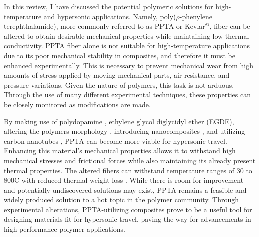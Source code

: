 \documentclass[12pt]{article}
\begin{document}
\begin{multicols}{2}
\indent In this review, I have discussed the potential polymeric solutions for high-temperature and hypersonic applications. Namely, poly($\rho$-phenylene terephthalamide), more commonly referred to as PPTA or Kevlar$^{\text{\textcopyright}}$, fiber can be altered to obtain desirable mechanical properties while maintaining low thermal conductivity. \citep{LiTong2022} PPTA fiber alone is not suitable for high-temperature applications due to its poor mechanical stability in composites, and therefore it must be enhanced experimentally. This is necessary to prevent mechanical wear from high amounts of stress applied by moving mechanical parts, air resistance, and pressure variations. Given the nature of polymers, this task is not arduous. Through the use of many different experimental techniques, these properties can be closely monitored as modifications are made. 

\indent By making use of polydopamine \citep{Yuan2017}, ethylene glycol diglycidyl ether (EGDE)\citep{LeiWang2017}, altering the polymers morphology \citep{Kanbargi2017}, introducing nanocomposites \citep{BoZhang2021}, and utilizing carbon nanotubes \citep{Yang2019}, PPTA can become more viable for hypersonic travel. Enhancing this material's mechanical properties allows it to withstand high mechanical stresses and frictional forces while also maintaining its already present thermal properties. The altered fibers can withstand temperature ranges of 30 to 800\degree C with reduced thermal weight loss \citep{ShushengChen2014}. While there is room for improvement and potentially undiscovered solutions may exist, PPTA remains a feasible and widely produced solution to a hot topic in the polymer community. Through experimental alterations, PPTA-utilizing composites prove to be a useful tool for designing materials fit for hypersonic travel, paving the way for advancements in high-performance polymer applications.

\end{multicols}

\newpage 


 
\end{document}
